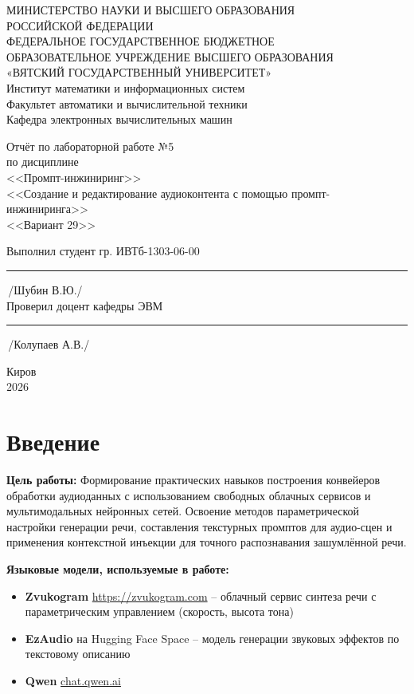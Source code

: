 \documentclass[oneside,a4paper,14pt]{extarticle}
\begin{document}
	\newpage\thispagestyle{empty}
	\begin{center}
		МИНИСТЕРСТВО НАУКИ И ВЫСШЕГО ОБРАЗОВАНИЯ\\
		РОССИЙСКОЙ ФЕДЕРАЦИИ\\
		ФЕДЕРАЛЬНОЕ ГОСУДАРСТВЕННОЕ БЮДЖЕТНОЕ\\
		ОБРАЗОВАТЕЛЬНОЕ УЧРЕЖДЕНИЕ ВЫСШЕГО ОБРАЗОВАНИЯ\\
		«ВЯТСКИЙ ГОСУДАРСТВЕННЫЙ УНИВЕРСИТЕТ»\\
		Институт математики и информационных систем\\
		Факультет автоматики и вычислительной техники\\
		Кафедра электронных вычислительных машин
	\end{center}
	\vspace{20mm}
	\begin{center}
		Отчёт по лабораторной работе №5\\
		по дисциплине\\
		<<Промпт-инжиниринг>>\\
		<<Создание и редактирование аудиоконтента с помощью промпт-инжиниринга>>\\
		<<Вариант 29>>\\
	\end{center}
	\vspace{48mm}
	\noindent
	Выполнил студент гр. ИВТб-1303-06-00 \hfill \rule[-0.5mm]{30mm}{0.15mm}\,/Шубин В.Ю./\\[0.5cm]
	Проверил доцент кафедры ЭВМ \hfill \rule[-0.5mm]{30mm}{0.15mm}\,/Колупаев А.В./
	\vfill
	\begin{center}
		Киров\\
		2026
	\end{center}
	\newpage
	\thispagestyle{empty}
	\section*{Введение}
	\noindent\textbf{Цель работы:} Формирование практических навыков построения конвейеров обработки аудиоданных с использованием свободных облачных сервисов и мультимодальных нейронных сетей. Освоение методов параметрической настройки генерации речи, составления текстурных промптов для аудио-сцен и применения контекстной инъекции для точного распознавания зашумлённой речи.
	
	\noindent\textbf{Языковые модели, используемые в работе:}
	\begin{itemize}
		\item \textbf{Zvukogram} \url{https://zvukogram.com} -- облачный сервис синтеза речи с параметрическим управлением (скорость, высота тона)
		\item \textbf{EzAudio} на Hugging Face Space -- модель генерации звуковых эффектов по текстовому описанию
		\item \textbf{Qwen} \url{chat.qwen.ai}
	\end{itemize}
	
\end{document}
